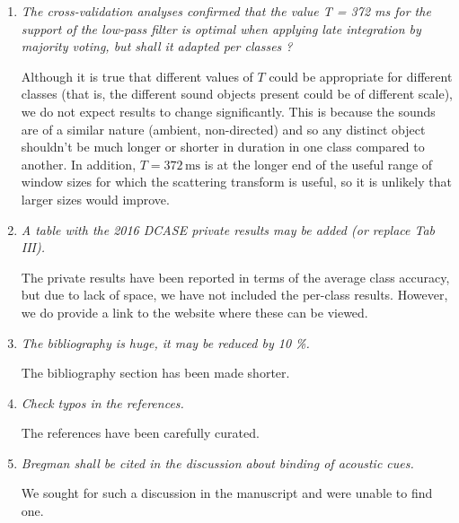 \documentclass[10pt]{article}
\begin{document}
\begin{enumerate}

\item \emph{The cross-validation analyses confirmed that the value T = 372 ms for the support of the low-pass filter is optimal when applying late integration by majority voting, but shall it adapted per classes  ?}

Although it is true that different values of $T$ could be appropriate for different classes (that is, the different sound objects present could be of different scale), we do not expect results to change significantly. This is because the sounds are of a similar nature (ambient, non-directed) and so any distinct object shouldn't be much longer or shorter in duration in one class compared to another. In addition, $T = 372\,\mathrm{ms}$ is at the longer end of the useful range of window sizes for which the scattering transform is useful, so it is unlikely that larger sizes would improve.

\item \emph{A table with the 2016 DCASE private results may be added (or replace Tab III).}

The private results have been reported in terms of the average class accuracy, but due to lack of space, we have not included the per-class results. However, we do provide a link to the website where these can be viewed.

\item \emph{The bibliography is huge, it may be reduced by 10 \%.}

The bibliography section has been made shorter. 

\item \emph{Check typos in the references.}

The references have been carefully curated.

\item \emph{Bregman shall be cited in the discussion about  binding of acoustic cues.}

We sought for such a discussion in the manuscript and were unable to find one.

\end{enumerate}
\end{document}
